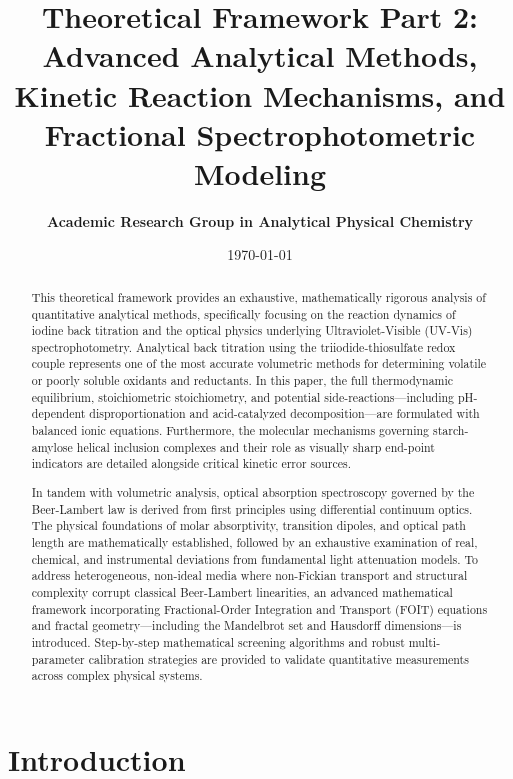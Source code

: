 \documentclass[12pt]{article}
\title{\textbf{Theoretical Framework Part 2: Advanced Analytical Methods, Kinetic Reaction Mechanisms, and Fractional Spectrophotometric Modeling}}
\author{\textbf{Academic Research Group in Analytical Physical Chemistry}}
\date{\today}
\begin{document}
\maketitle

\begin{abstract}
This theoretical framework provides an exhaustive, mathematically rigorous analysis of quantitative analytical methods, specifically focusing on the reaction dynamics of iodine back titration and the optical physics underlying Ultraviolet-Visible (UV-Vis) spectrophotometry. Analytical back titration using the triiodide-thiosulfate redox couple represents one of the most accurate volumetric methods for determining volatile or poorly soluble oxidants and reductants. In this paper, the full thermodynamic equilibrium, stoichiometric stoichiometry, and potential side-reactions—including pH-dependent disproportionation and acid-catalyzed decomposition—are formulated with balanced ionic equations. Furthermore, the molecular mechanisms governing starch-amylose helical inclusion complexes and their role as visually sharp end-point indicators are detailed alongside critical kinetic error sources.

In tandem with volumetric analysis, optical absorption spectroscopy governed by the Beer-Lambert law is derived from first principles using differential continuum optics. The physical foundations of molar absorptivity, transition dipoles, and optical path length are mathematically established, followed by an exhaustive examination of real, chemical, and instrumental deviations from fundamental light attenuation models. To address heterogeneous, non-ideal media where non-Fickian transport and structural complexity corrupt classical Beer-Lambert linearities, an advanced mathematical framework incorporating Fractional-Order Integration and Transport (FOIT) equations and fractal geometry—including the Mandelbrot set and Hausdorff dimensions—is introduced. Step-by-step mathematical screening algorithms and robust multi-parameter calibration strategies are provided to validate quantitative measurements across complex physical systems.
\end{abstract}

\newpage

\section{Introduction}
\end{document}
